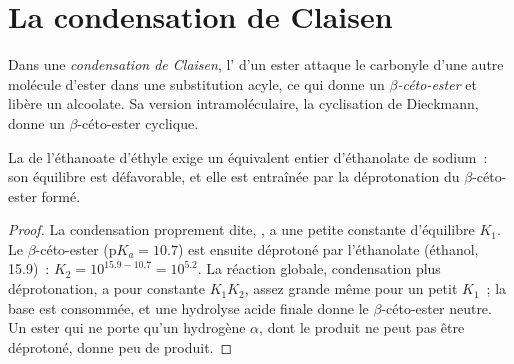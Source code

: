 \section{La condensation de Claisen}

\begin{definition}\label{def:b2:enolates-aldol:claisen}
Dans une \emph{condensation de Claisen}, l' d'un ester attaque
le carbonyle d'une autre molécule d'ester dans une substitution acyle, ce qui donne un
\emph{$\beta$-céto-ester}
et libère un alcoolate. Sa version intramoléculaire, la cyclisation de Dieckmann, donne un
$\beta$-céto-ester cyclique.
\end{definition}

\begin{proposition}\label{prop:b2:enolates-aldol:claisen-drive}
La  de l'éthanoate d'éthyle exige un équivalent entier d'éthanolate de
sodium~: son équilibre est défavorable, et elle est entraînée par la déprotonation du
$\beta$-céto-ester formé.
\end{proposition}

\begin{proof}
La condensation proprement dite, , a une petite constante
d'équilibre $K_1$. Le $\beta$-céto-ester ($\mathrm pK_a = 10.7$) est ensuite déprotoné par
l'éthanolate (éthanol, 15.9)~:
$K_2 = 10^{15.9 - 10.7} = 10^{5.2}$. La réaction globale, condensation plus déprotonation, a pour
constante $K_1K_2$, assez grande même pour un petit $K_1$~; la base est consommée, et une hydrolyse
acide finale donne le $\beta$-céto-ester neutre. Un ester qui ne porte qu'un hydrogène $\alpha$, dont le
produit ne peut pas être déprotoné, donne peu de produit.
\end{proof}

